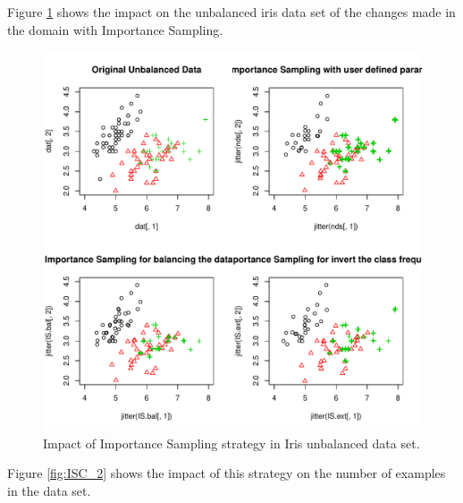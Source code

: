\documentclass[10pt,a4paper]{article}\usepackage[]{graphicx}\usepackage[]{color}
\makeatletter
\def\maxwidth{ %
  \ifdim\Gin@nat@width>\linewidth
    \linewidth
  \else
    \Gin@nat@width
  \fi
}
\newenvironment{knitrout}{}{} %
\makeatother
\begin{document}
Figure \ref{fig:ISC} shows the impact on the unbalanced iris data set of the changes made in the domain with Importance Sampling.

\begin{knitrout}\footnotesize
{}\color{fgcolor}\begin{figure}

{\centering \includegraphics[width=\maxwidth]{figures/UBL-ISC-1} 

}

\caption[Impact of Importance Sampling strategy in Iris unbalanced data set]{Impact of Importance Sampling strategy in Iris unbalanced data set.}\label{fig:ISC}
\end{figure}


\end{knitrout}



Figure \ref{fig:ISC_2} shows the impact of this strategy on the number of examples in the data set.
\end{document}
